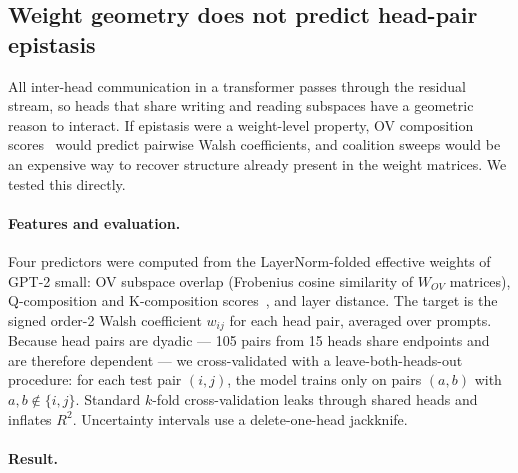 %
%

\subsection{Weight geometry does not predict head-pair epistasis}
\label{sec:weight-geometry}

All inter-head communication in a transformer passes through the residual
stream, so heads that share writing and reading subspaces have a geometric
reason to interact. If epistasis were a weight-level property, OV composition
scores~\citep{elhage2021mathematical} would predict pairwise Walsh
coefficients, and coalition sweeps would be an expensive way to recover
structure already present in the weight matrices. We tested this directly.

\paragraph{Features and evaluation.}

Four predictors were computed from the LayerNorm-folded effective
weights of GPT-2 small: OV subspace overlap (Frobenius cosine similarity
of $W_{OV}$ matrices), Q-composition and K-composition
scores~\citep{elhage2021mathematical}, and layer distance. The target is
the signed order-2 Walsh coefficient $w_{ij}$ for each head pair, averaged
over prompts. Because head pairs are dyadic --- 105 pairs from 15 heads
share endpoints and are therefore dependent --- we cross-validated with a
leave-both-heads-out procedure: for each test pair $(i,j)$, the model
trains only on pairs $(a,b)$ with $a,b \notin \{i,j\}$. Standard
$k$-fold cross-validation leaks through shared heads and inflates
$R^2$. Uncertainty intervals use a delete-one-head jackknife.

\paragraph{Result.}

